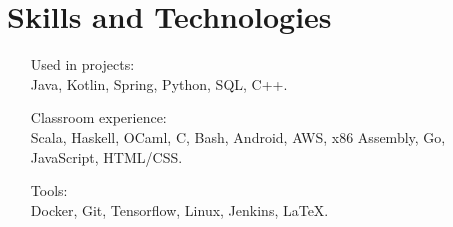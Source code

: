 \documentclass[10pt]{article}
\begin{document}
\section*{\color{accent} Skills and Technologies}
\begin{itemize}[font=\bfseries,  wide=1.5em,  leftmargin=*]
  \item[Used in projects:] \  \\ Java, Kotlin, Spring, Python, SQL, C++.
  \item[Classroom experience:] \ \\ Scala, Haskell, OCaml, C, Bash, Android, AWS, x86 Assembly, Go, JavaScript, HTML/CSS.
  \item[Tools:] \ \\ Docker, Git, Tensorflow, Linux, Jenkins, \LaTeX.
\end{itemize}
\end{document}

